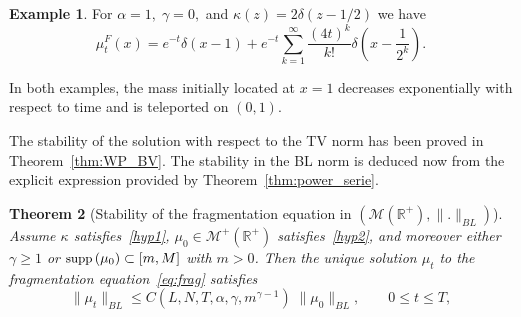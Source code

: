 \documentclass[10pt]{amsart}
\newtheorem{theo}{Theorem}[section]
\theoremstyle{definition}\newtheorem{defi}[theo]{Definition}\newtheorem{rema}[theo]{Remark}\newtheorem{exam}[theo]{Example}\newtheorem{exem}[theo]{Example}\newtheorem{nota}[theo]{Notation}
\newcommand*\R{\mathbb{R}}
\newcommand*\M{\mathcal{M}}
\newcommand*\supp{{\mbox{\small\rm supp}}\,}
\begin{document}
\begin{exam}
For $\alpha=1,\;\gamma=0,$ and $\kappa(z)=2 \delta(z-1/2)$ we have~\cite[Proposition~1]{DvB18}
\begin{equation*}
\mu_t^F(x)=e^{-t} \delta(x-1) + e^{-t} \sum_{k=1}^{\infty} \dfrac{(4t)^k}{k!}\delta\left(x-\dfrac{1}{2^k}\right).
\end{equation*}
\end{exam}

In both examples, the mass initially located at $x=1$ decreases exponentially with respect to time and is teleported on $(0,1)$.

The stability of the solution with respect to the TV norm has been proved in Theorem~\ref{thm:WP_BV}. The stability in the BL norm is deduced now from the explicit expression provided by Theorem~\ref{thm:power_serie}.

\begin{theo}[Stability of the fragmentation equation in $(\M(\R^+),\|.\|_{BL})$]\label{thm:stabBL}
Assume $\kappa$ satisfies~\eqref{hyp1}, $\mu_0 \in \M^+(\R^+)$ satisfies~\eqref{hyp2}, and moreover either $\gamma\geq 1$ or $\supp (\mu_0)\subset [m,M]$ with $m>0$. Then the unique solution $\mu_t$ to the fragmentation equation~\eqref{eq:frag} satisfies
\begin{equation*}
\|\mu_t\|_{BL}
\leq C\left(L,N,T,\alpha,\gamma,m^{\gamma-1}\right) \; \|\mu_0\|_{BL}, \qquad 0 \leq t \leq T,
\end{equation*}
\end{theo}
\end{document}
